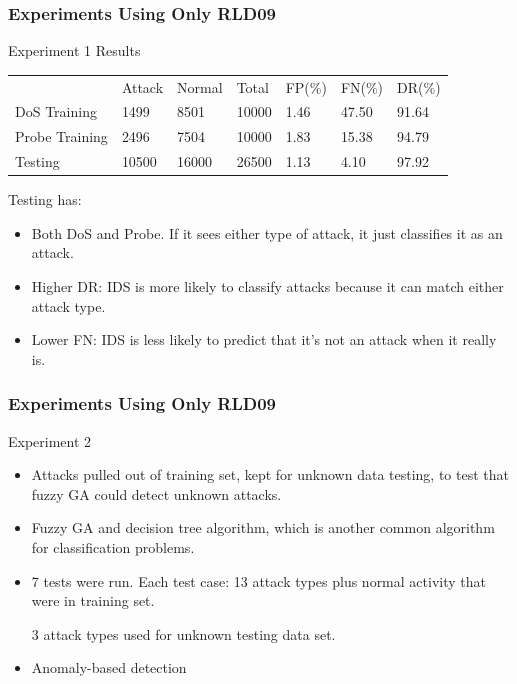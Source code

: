 \documentclass{beamer}
\newcommand{\linespace}{\vskip 0.25cm}
\begin{document}
\begin{frame}
	\frametitle{Experiments Using Only RLD09}
	Experiment 1 Results
\begin{table}
\begin{small}
\begin{tabular}{lllllll}
 & Attack & Normal & Total & FP(\%) & FN(\%) & DR(\%)\\
DoS Training & 1499 & 8501 & 10000 & 1.46 & 47.50 & 91.64\\
Probe Training & 2496 & 7504 & 10000 & 1.83 & 15.38 & 94.79\\
Testing & 10500 & 16000 & 26500 & 1.13 & 4.10 & 97.92\\
\end{tabular}
\end{small}
\end{table}

\linespace
Testing has:
\begin{itemize}
	\item Both DoS and Probe. If it sees either type of attack, it just classifies it as an attack.
	\item Higher DR: IDS is more likely to classify attacks because it can match either attack type.
	\item Lower FN: IDS is less likely to predict that it's not an attack when it really is.
\end{itemize}
\end{frame}


\begin{frame}
	\frametitle{Experiments Using Only RLD09}
Experiment 2
	\begin{itemize}
		\item Attacks pulled out of training set, kept for unknown data testing, to test that fuzzy GA could detect unknown attacks.
		\item Fuzzy GA and decision tree algorithm, which is another common algorithm for classification problems.
		\item 7 tests were run. Each test case: 13 attack types plus normal activity that were in training set. 
		
		3 attack types used for unknown testing data set.
		\item Anomaly-based detection
	\end{itemize}
\end{frame}
\end{document}

